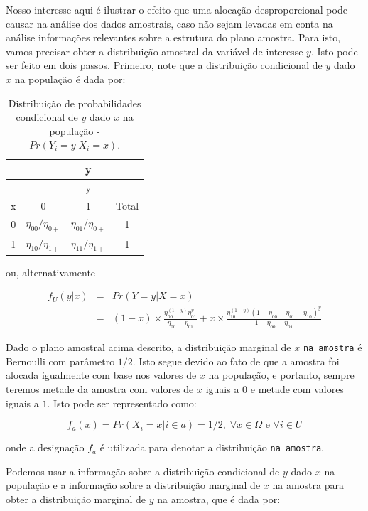\documentclass[]{book}
\theoremstyle{definition}
\theoremstyle{definition}
\theoremstyle{definition}
\theoremstyle{remark}
\begin{document}
Nosso interesse aqui é ilustrar o efeito que uma alocação
desproporcional pode causar na análise dos dados amostrais, caso não
sejam levadas em conta na análise informações relevantes sobre a
estrutura do plano amostra. Para isto, vamos precisar obter a
distribuição amostral da variável de interesse \(y\). Isto pode ser
feito em dois passos. Primeiro, note que a distribuição condicional de
\(y\) dado \(x\) na população é dada por:

\begin{longtable}[]{@{}cccc@{}}
\caption{\label{tab:Tab25} Distribuição de probabilidades condicional de
\(y\) dado \(x\) na população -
\(Pr( Y_i = y | X_i = x )\).}\tabularnewline
\toprule
& & y &\tabularnewline
\midrule
\endfirsthead
\toprule
& & y &\tabularnewline
\midrule
\endhead
x & 0 & 1 & Total\tabularnewline
0 & \(\eta_{00}/\eta_{0+}\) & \(\eta_{01}/\eta_{0+}\) & 1\tabularnewline
1 & \(\eta_{10}/\eta_{1+}\) & \(\eta_{11}/\eta_{1+}\) & 1\tabularnewline
\bottomrule
\end{longtable}

ou, alternativamente

\begin{eqnarray}
 f_U (y | x) &=& Pr( Y = y | X = x )\\
             & =& (1-x) \times \frac{\eta_{00}^{(1-y)} \eta_{01}^y}   {\eta_{00}+\eta_{01}} + x \times \frac{\eta_{10}^{(1-y)} (1 - \eta_{00} - \eta_{01} - \eta_{10})^y} {1 - \eta_{00} - \eta_{01}}\nonumber
\end{eqnarray}

Dado o plano amostral acima descrito, a distribuição marginal de \(x\)
\texttt{na\ amostra} é Bernoulli com parâmetro \(1/2\). Isto segue
devido ao fato de que a amostra foi alocada igualmente com base nos
valores de \(x\) na população, e portanto, sempre teremos metade da
amostra com valores de \(x\) iguais a \(0\) e metade com valores iguais
a \(1\). Isto pode ser representado como:

\begin{equation}
 f_a (x) = Pr( X_i = x | i \in a ) = 1 / 2,\; \forall x \in \Omega \mbox{ e } \forall i \in U
\end{equation}

onde a designação \(f_a\) é utilizada para denotar a distribuição
\texttt{na\ amostra}.

Podemos usar a informação sobre a distribuição condicional de \(y\) dado
\(x\) na população e a informação sobre a distribuição marginal de \(x\)
na amostra para obter a distribuição marginal de \(y\) na amostra, que é
dada por:
\end{document}
